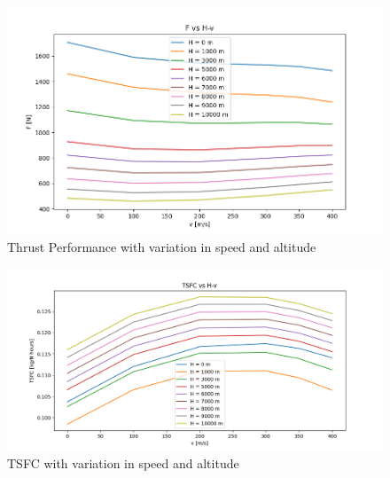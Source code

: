 \documentclass[titlepage]{article}
\begin{document}
\begin{figure}[h]
  \centering
  \includegraphics[width=\textwidth]{FHV.png}
  \caption{Thrust Performance with variation in speed and altitude}
  \label{fig:ThrustVar}
\end{figure}

\begin{figure}[h]
  \centering
  \includegraphics[width=\textwidth]{TSFCHV.png}
  \caption{TSFC with variation in speed and altitude}
  \label{fig:TSFCVar}
\end{figure}
\end{document}
